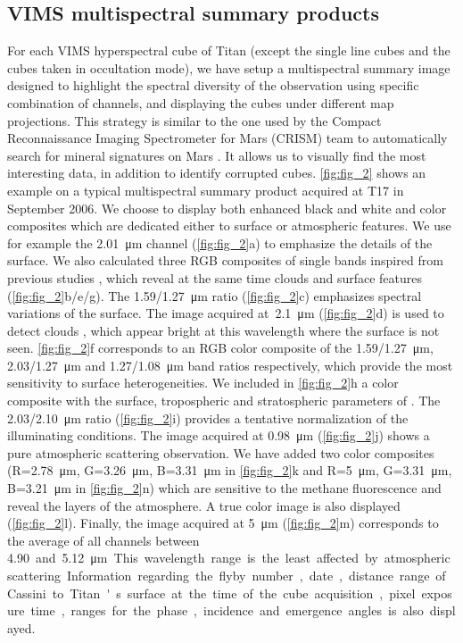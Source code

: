 \documentclass[preprint,twocolumn,5p,authoryear,compress,colorlinks=true]{elsarticle}
\newcommand{\figref}[1]{\autoref{fig:#1}}
\begin{document}
{\subsection{VIMS multispectral summary products}
For each VIMS hyperspectral cube of Titan (except the single line cubes and the cubes taken in occultation mode), we have setup a multispectral summary image designed to highlight the spectral diversity of the observation using specific combination of channels, and displaying the cubes under different map projections.
This strategy is similar to the one used by the Compact Reconnaissance Imaging Spectrometer for Mars (CRISM) team to automatically search for mineral signatures on Mars \citep{Pelkey2007}.
It allows us to visually find the most interesting data, in addition to identify corrupted cubes. \figref{fig_2} shows an example on a typical multispectral summary product acquired at T17 in September 2006. We choose to display both enhanced black and white and color composites which are dedicated either to surface or atmospheric features. We use for example the \SI{2.01}{\um} channel (\figref{fig_2}a) to emphasize the details of the surface.
We also calculated three RGB composites of single bands inspired from previous studies \citep{Barnes2007, Soderblom2009a, LeMouelic2012a}, which reveal at the same time clouds and surface features (\figref{fig_2}b/e/g).
The \SI{1.59/1.27}{\um} ratio (\figref{fig_2}c) emphasizes spectral variations of the surface. The image acquired at \SI{2.1}{\um} (\figref{fig_2}d) is used to detect clouds \citep{Rodriguez2009, Rodriguez2011, Turtle2018}, which appear bright at this wavelength where the surface is not seen.
\figref{fig_2}f corresponds to an RGB color composite of the \SI{1.59/1.27}{\um}, \SI{2.03/1.27}{\um} and \SI{1.27/1.08}{\um} band ratios respectively, which provide the most sensitivity to surface heterogeneities.
We included in \figref{fig_2}h a color composite with the surface, tropospheric and stratospheric parameters of \cite{Brown2010}.
The \SI{2.03/2.10}{\um} ratio (\figref{fig_2}i) provides a tentative normalization of the illuminating conditions.
The image acquired at \SI{0.98}{\um} (\figref{fig_2}j) shows a pure atmospheric scattering observation. We have added two color composites (R=\SI{2.78}{\um}, G=\SI{3.26}{\um}, B=\SI{3.31}{\um} in \figref{fig_2}k and R=\SI{5}{\um}, G=\SI{3.31}{\um}, B=\SI{3.21}{\um} in \figref{fig_2}n) which are sensitive to the methane fluorescence and reveal the layers of the atmosphere.
A true color image is also displayed (\figref{fig_2}l).
Finally, the image acquired at \SI{5}{\um} (\figref{fig_2}m) corresponds to the average of all channels between \SI{4.90} and \SI{5.12}{\um}.
This wavelength range is the least affected by atmospheric scattering. Information regarding the flyby number, date, distance range of Cassini to Titan's surface at the time of the cube acquisition, pixel exposure time, ranges for the phase, incidence and emergence angles is also displayed.

}
\end{document}

